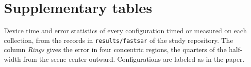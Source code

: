 \documentclass[11pt]{article}
\begin{document}
\section*{Supplementary tables}
Device time and error statistics of every configuration timed or measured on each collection, from the records in
\texttt{results/fastsar} of the study repository. The column \emph{Rings} gives the error in four concentric regions, the
quarters of the half-width from the scene center outward. Configurations are labeled as in the paper.

\end{document}
